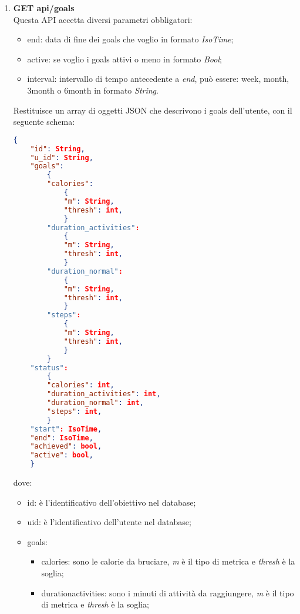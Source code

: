 \begin{enumerate}
\begin{itemize}
\begin{itemize}
            \item fit\textunderscore profiles: sono i profili fit dell'utente;
        \end{itemize}
    \end{itemize}
    \item \textbf{GET api/goals}\\
    Questa API accetta diversi parametri obbligatori:
    \begin{itemize}
        \item end: data di fine dei goals che voglio in formato \textit{IsoTime};
        \item active: se voglio i goals attivi o meno in formato \textit{Bool};
        \item interval: intervallo di tempo antecedente a \textit{end}, può essere: week, month, 3month o 6month in formato \textit{String}.
    \end{itemize}
    Restituisce un array di oggetti JSON che descrivono i goals dell'utente, con il seguente schema:
    \begin{lstlisting}[language=json,firstnumber=1,caption={JSON schema dell'API GET api/goals},captionpos=b]
    {
    "id": String,
    "u_id": String,
    "goals":
        {
        "calories":
            {
            "m": String,
            "thresh": int,
            }    
        "duration_activities":
            {
            "m": String,
            "thresh": int,
            }    
        "duration_normal":
            {
            "m": String,
            "thresh": int,
            }    
        "steps":
            {
            "m": String,
            "thresh": int,
            }    
        }
    "status":
        {
        "calories": int,
        "duration_activities": int,
        "duration_normal": int,
        "steps": int,
        }
    "start": IsoTime,
    "end": IsoTime,
    "achieved": bool,
    "active": bool,
    }
    \end{lstlisting}
    dove: \begin{itemize}
        \item id: è l'identificativo dell'obiettivo nel database;
        \item u\textunderscore id: è l'identificativo dell'utente nel database;
        \item goals:
        \begin{itemize}
            \item calories: sono le calorie da bruciare, \textit{m} è il tipo di metrica e \textit{thresh} è la soglia;
            \item duration\textunderscore activities: sono i minuti di attività da raggiungere, \textit{m} è il tipo di metrica e \textit{thresh} è la soglia;

\end{itemize}
\end{itemize}
\end{enumerate}
